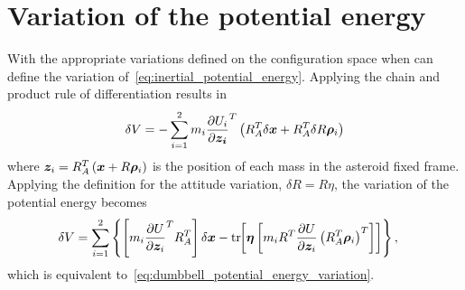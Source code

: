 \section{Variation of the potential energy}\label{sec:inertial_potential_energy_variation}
With the appropriate variations defined on the configuration space when can define the variation of~\cref{eq:inertial_potential_energy}.
Applying the chain and product rule of differentiation results in
\begin{align}
    \delta V = - \sum_{i=1}^{2} m_i \frac{\partial U_i}{\partial \bm{z_i}}^T \left(  R_A^T \delta \bm{x} + R_A^T \delta R \bm{\rho}_i \right)
\end{align}
where \( \bm{z}_i = R_A^T \left( \bm{x} + R \bm{\rho}_i \right) \) is the position of each mass in the asteroid fixed frame.
Applying the definition for the attitude variation, \(\delta R = R \eta \), the variation of the potential energy becomes
\begin{align*}
    \delta V &= \sum_{i=1}^2 \left\{  \left[ m_i \frac{\partial U}{\partial \bm{z}_i}^T R_A^T  \right] \delta \bm{x} - \mathrm{tr}\negthickspace\left[  \bm{\eta} \left[ m_i R^T \frac{\partial U}{\partial \bm{z}_i} \left( R_A^T \bm{\rho}_i \right)^T \right] \right]  \right\},
\end{align*}
which is equivalent to~\cref{eq:dumbbell_potential_energy_variation}.
